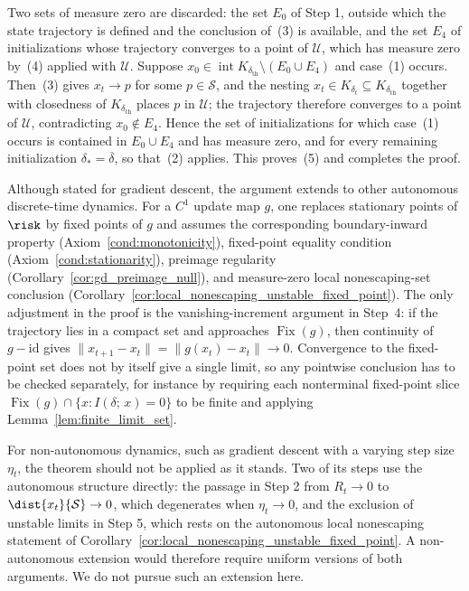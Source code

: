 \documentclass{article}
\begin{document}
Two sets of measure zero are discarded: the set $E_0$ of Step 1, outside which
the state trajectory is defined and the conclusion of~(3) is available, and the
set $E_4$ of initializations whose trajectory converges to a point of
$\mathcal U$, which has measure zero by~(4) applied with $\mathcal U$. Suppose
$x_0\in\operatorname{int}K_{\delta_{\mathrm{th}}}\setminus(E_0\cup E_4)$ and
case~(1) occurs. Then~(3) gives $x_t\to p$ for some $p\in\mathcal S$, and the
nesting $x_t\in K_{\delta_t}\subseteq K_{\delta_{\mathrm{th}}}$ together with
closedness of $K_{\delta_{\mathrm{th}}}$ places $p$ in $\mathcal U$; the
trajectory therefore converges to a point of $\mathcal U$, contradicting
$x_0\notin E_4$. Hence the
set of initializations for which case~(1) occurs is contained in
$E_0\cup E_4$ and has measure zero, and for every remaining initialization
$\delta_\ast=\overline\delta$, so that~(2) applies. This proves~(5) and
completes the proof.

\begin{remark}
Although stated for gradient descent, the argument extends to other autonomous
discrete-time dynamics. For a $C^1$ update map $g$, one replaces stationary
points of $\risk$ by fixed points of $g$ and assumes the corresponding
boundary-inward property (Axiom~\ref{cond:monotonicity}), fixed-point equality
condition (Axiom~\ref{cond:stationarity}), preimage regularity
(Corollary~\ref{cor:gd_preimage_null}), and measure-zero local nonescaping-set
conclusion (Corollary~\ref{cor:local_nonescaping_unstable_fixed_point}). The
only adjustment in the proof is the vanishing-increment argument in Step~4:
if the trajectory lies in a compact set and approaches $\operatorname{Fix}(g)$,
then continuity of $g-\mathrm{id}$ gives
$\|x_{t+1}-x_t\|=\|g(x_t)-x_t\|\to0$. Convergence to the fixed-point set does
not by itself give a single limit, so any pointwise conclusion has to be
checked separately, for instance by requiring each nonterminal fixed-point
slice $\operatorname{Fix}(g)\cap\{x:I(\delta;\,x)=0\}$ to be finite and applying
Lemma~\ref{lem:finite_limit_set}.

For non-autonomous dynamics, such as gradient descent with a varying step size
$\eta_t$, the theorem should not be applied as it stands. Two of its steps use
the autonomous structure directly: the passage in Step 2 from $R_t\to0$ to
$\dist{x_t}{\mathcal S}\to0$, which degenerates when
$\eta_t\to0$, and the exclusion of unstable limits in Step 5, which rests on
the autonomous local nonescaping statement of
Corollary~\ref{cor:local_nonescaping_unstable_fixed_point}. A non-autonomous
extension would therefore require uniform versions of both arguments. We do
not pursue such an extension here.
\end{remark}
\end{document}
